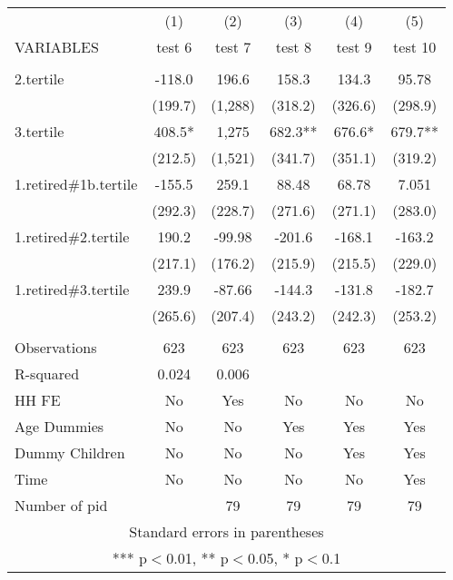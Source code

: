 \begin{tabular}{lccccc} \hline
 & (1) & (2) & (3) & (4) & (5) \\
VARIABLES & test 6 & test 7 & test 8 & test 9 & test 10 \\ \hline
 &  &  &  &  &  \\
2.tertile & -118.0 & 196.6 & 158.3 & 134.3 & 95.78 \\
 & (199.7) & (1,288) & (318.2) & (326.6) & (298.9) \\
3.tertile & 408.5* & 1,275 & 682.3** & 676.6* & 679.7** \\
 & (212.5) & (1,521) & (341.7) & (351.1) & (319.2) \\
1.retired\#1b.tertile & -155.5 & 259.1 & 88.48 & 68.78 & 7.051 \\
 & (292.3) & (228.7) & (271.6) & (271.1) & (283.0) \\
1.retired\#2.tertile & 190.2 & -99.98 & -201.6 & -168.1 & -163.2 \\
 & (217.1) & (176.2) & (215.9) & (215.5) & (229.0) \\
1.retired\#3.tertile & 239.9 & -87.66 & -144.3 & -131.8 & -182.7 \\
 & (265.6) & (207.4) & (243.2) & (242.3) & (253.2) \\
 &  &  &  &  &  \\
Observations & 623 & 623 & 623 & 623 & 623 \\
R-squared & 0.024 & 0.006 &  &  &  \\
HH FE & No & Yes & No & No & No \\
Age Dummies & No & No & Yes & Yes & Yes \\
Dummy Children & No & No & No & Yes & Yes \\
Time & No & No & No & No & Yes \\
 Number of pid &  & 79 & 79 & 79 & 79 \\ \hline
\multicolumn{6}{c}{ Standard errors in parentheses} \\
\multicolumn{6}{c}{ *** p$<$0.01, ** p$<$0.05, * p$<$0.1} \\
\end{tabular}
